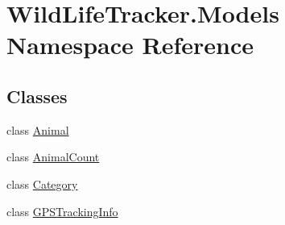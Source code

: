 \hypertarget{namespaceWildLifeTracker_1_1Models}{}\section{Wild\+Life\+Tracker.\+Models Namespace Reference}
\label{namespaceWildLifeTracker_1_1Models}
\subsection*{Classes}
\begin{DoxyCompactItemize}
\item 
class \hyperlink{classWildLifeTracker_1_1Models_1_1Animal}{Animal}
\item 
class \hyperlink{classWildLifeTracker_1_1Models_1_1AnimalCount}{Animal\+Count}
\item 
class \hyperlink{classWildLifeTracker_1_1Models_1_1Category}{Category}
\item 
class \hyperlink{classWildLifeTracker_1_1Models_1_1GPSTrackingInfo}{G\+P\+S\+Tracking\+Info}
\end{DoxyCompactItemize}
